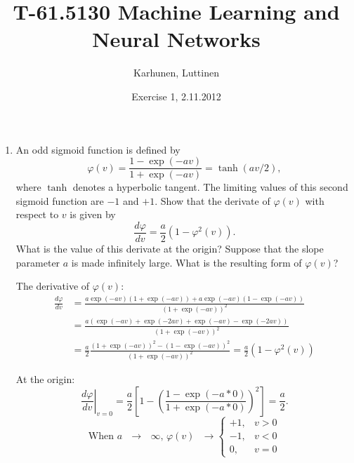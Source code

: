 
\title{T-61.5130 Machine Learning and Neural Networks}
\author{Karhunen, Luttinen}
\date{Exercise 1, 2.11.2012}

\newcommand{\vect}[1]{{\bf{#1}}}
\newcommand{\svect}[1]{\boldsymbol{#1}}
\newcommand{\matr}[1]{\boldsymbol{#1}}



\maketitle

\begin{enumerate}

\item

  An odd sigmoid function is defined by
  \begin{equation}
    \label{eq:sigmoid}
    \varphi(v)=\frac{1-\exp(-av)}{1+\exp(-av)}=\tanh(av/2),
  \end{equation}
  where $\tanh$ denotes a hyperbolic tangent. The limiting values of
  this second sigmoid function are $-1$ and $+1$. Show that the derivate 
  of $\varphi(v)$ with respect to $v$ is given by
  \begin{equation*}
    \frac{d\varphi}{dv}=\frac{a}{2}(1-\varphi^2(v)).
  \end{equation*}
  What is the value of this derivate at the origin? Suppose that the
  slope parameter $a$ is made infinitely large. What is the resulting
  form of $\varphi(v)$?  
  
  \begin{solution}

    The derivative of $\varphi(v)$:
    \begin{equation*}
      \begin{split}
        \frac{d\varphi}{dv}&=\frac{a\exp(-av) (1 + \exp(-av)) + a\exp(-av)
          (1 - \exp(-av))} {(1+\exp(-av))^2} \\
        &= \frac{a ( \exp(-av) + \exp(-2av) + \exp(-av) - \exp(-2av) )}{(1 +
          \exp(-av))^2} \\
        &= \frac{a}{2} \frac{(1 + \exp(-av))^2 - (1 - \exp(-av))^2}{(1 +
          \exp(-av))^2} = \frac{a}{2} ( 1 - \varphi^2(v) )
      \end{split}
    \end{equation*}

    At the origin: 
    \begin{equation*}
      \left.\frac{d\varphi}{dv}\right|_{v=0} = \frac{a}{2} \left[1 - \left(
        \frac{1 - \exp(-a * 0)}{1 + \exp(-a*0)} \right)^2\right] = \frac{a}{2}.
    \end{equation*}
    \begin{equation*}
      \mbox{When  $a$ $\rightarrow$ $\infty$,  $\varphi(v)$ $\rightarrow$} \left\{ 
        \begin{array}{rl}
          +1, &v > 0 \\
          -1, &v < 0 \\
          0, &v = 0
        \end{array} \right.
    \end{equation*}


\end{solution}
\end{enumerate}
